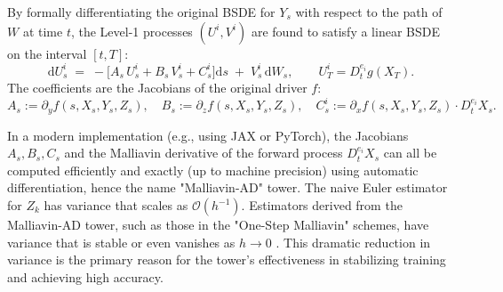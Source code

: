 \begin{proposition}
\label{prop:level1_bsde}
By formally differentiating the original BSDE for \(Y_s\) with respect to the path of \(W\) at time \(t\), the Level-1 processes \((U^i, V^i)\) are found to satisfy a linear BSDE on the interval \([t,T]\):
\begin{equation}\label{eq:U_BSDE_main}
  \mathrm{d} U^{i}_s
  \;=\;
   -\bigl[A_s\,U^{i}_s + B_s\,V^{i}_s + C^{i}_s \bigr]\mathrm{d} s
   \;+\;
   V^{i}_s\,\mathrm{d} W_s,
  \qquad
  U^{i}_T = D_t^{e_i}g(X_T).
\end{equation}
The coefficients are the Jacobians of the original driver \(f\):
\[
  A_s := \partial_y f(s,X_s,Y_s,Z_s), \quad
  B_s := \partial_z f(s,X_s,Y_s,Z_s), \quad
  C^{i}_s := \partial_x f(s,X_s,Y_s,Z_s) \cdot D_t^{e_i}X_s.
\]
\end{proposition}

\begin{remark}
In a modern implementation (e.g., using JAX or PyTorch), the Jacobians \(A_s, B_s, C_s\) and the Malliavin derivative of the forward process \(D_t^{e_i}X_s\) can all be computed efficiently and exactly (up to machine precision) using automatic differentiation, hence the name "Malliavin-AD" tower. The naive Euler estimator for \(Z_k\) has variance that scales as \(\mathcal{O}(h^{-1})\). Estimators derived from the Malliavin-AD tower, such as those in the "One-Step Malliavin" schemes, have variance that is stable or even vanishes as \(h \to 0\) \cite{DomelevoWarin2023}. This dramatic reduction in variance is the primary reason for the tower's effectiveness in stabilizing training and achieving high accuracy.
\end{remark}

